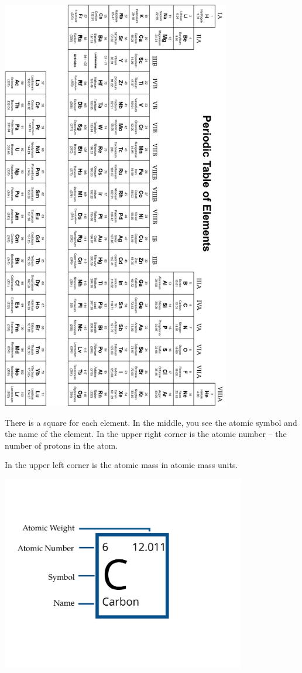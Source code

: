 \includegraphics[width=0.75\textwidth]{periodic.png}


\pagebreak
There is a square for each element. In the middle, you see the atomic
symbol and the name of the element. In the upper right corner is the
atomic number -- the number of protons in the atom.

In the upper left corner is the atomic mass in atomic mass units.

\includegraphics[width=0.8\textwidth]{element.png}

